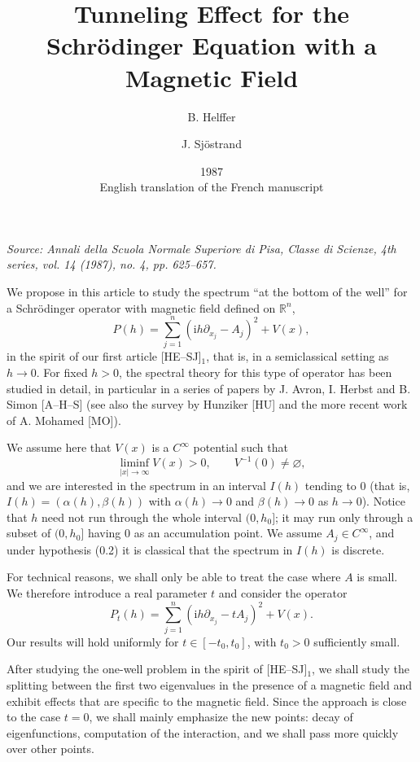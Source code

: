 \documentclass[11pt]{article}
\title{Tunneling Effect for the Schrödinger Equation with a Magnetic Field}
\author{B. Helffer \and J. Sjöstrand}
\date{1987\\[1ex]\small English translation of the French manuscript}
\newcommand{\R}{\mathbb{R}}
\newcommand{\ii}{\mathrm{i}}
\begin{document}
\maketitle

\begin{center}
\emph{Source: Annali della Scuola Normale Superiore di Pisa, Classe di Scienze, 4th series, vol. 14 (1987), no. 4, pp. 625--657.}
\end{center}

\medskip

We propose in this article to study the spectrum ``at the bottom of the well'' for a Schrödinger operator with magnetic field defined on $\R^n$,
\begin{equation}
P(h)=\sum_{j=1}^n(\ii h\partial_{x_j}-A_j)^2+V(x),
\tag{0.1}
\end{equation}
in the spirit of our first article [HE--SJ]$_1$, that is, in a semiclassical setting as $h\to0$.
For fixed $h>0$, the spectral theory for this type of operator has been studied in detail, in particular in a series of papers by J. Avron, I. Herbst and B. Simon [A--H--S] (see also the survey by Hunziker [HU] and the more recent work of A. Mohamed [MO]).

We assume here that $V(x)$ is a $C^\infty$ potential such that
\begin{equation}
\liminf_{|x|\to\infty}V(x)>0,
\qquad
V^{-1}(0)\neq\varnothing,
\tag{0.2}
\end{equation}
and we are interested in the spectrum in an interval $I(h)$ tending to $0$ (that is, $I(h)=(\alpha(h),\beta(h))$ with $\alpha(h)\to0$ and $\beta(h)\to0$ as $h\to0$).
Notice that $h$ need not run through the whole interval $(0,h_0]$; it may run only through a subset of $(0,h_0]$ having $0$ as an accumulation point.
We assume $A_j\in C^\infty$, and under hypothesis (0.2) it is classical that the spectrum in $I(h)$ is discrete.

For technical reasons, we shall only be able to treat the case where $A$ is small. We therefore introduce a real parameter $t$ and consider the operator
\begin{equation}
P_t(h)=\sum_{j=1}^n(\ii h\partial_{x_j}-tA_j)^2+V(x).
\tag{0.3}
\end{equation}
Our results will hold uniformly for $t\in[-t_0,t_0]$, with $t_0>0$ sufficiently small.

After studying the one-well problem in the spirit of [HE--SJ]$_1$, we shall study the splitting between the first two eigenvalues in the presence of a magnetic field and exhibit effects that are specific to the magnetic field.
Since the approach is close to the case $t=0$, we shall mainly emphasize the new points: decay of eigenfunctions, computation of the interaction, and we shall pass more quickly over other points.
\end{document}

